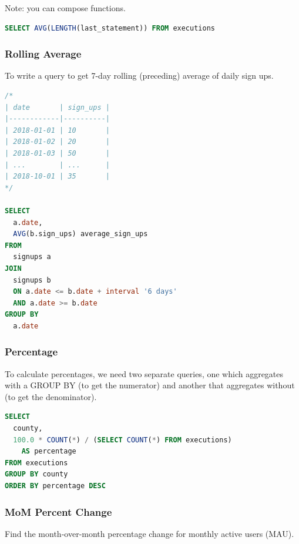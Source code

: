 \documentclass{article}
\begin{document}
Note: you can compose functions.

\vspace{8pt} \begin{lstlisting}[language=SQL]
SELECT AVG(LENGTH(last_statement)) FROM executions
\end{lstlisting} \vspace{8pt}


\subsubsection{Rolling Average}
To write a query to get 7-day rolling (preceding) average of daily sign ups.

\vspace{8pt} \begin{lstlisting}[language=SQL]
/*
| date       | sign_ups |
|------------|----------|
| 2018-01-01 | 10       |
| 2018-01-02 | 20       |
| 2018-01-03 | 50       |
| ...        | ...      |
| 2018-10-01 | 35       |
*/

SELECT 
  a.date, 
  AVG(b.sign_ups) average_sign_ups 
FROM 
  signups a 
JOIN 
  signups b 
  ON a.date <= b.date + interval '6 days' 
  AND a.date >= b.date
GROUP BY 
  a.date
\end{lstlisting} \vspace{8pt}

\subsubsection{Percentage}

To calculate percentages, we need two separate queries, one which aggregates with a GROUP BY (to get the numerator) and another that aggregates without (to get the denominator). 

\vspace{8pt} \begin{lstlisting}[language=SQL]
SELECT
  county,
  100.0 * COUNT(*) / (SELECT COUNT(*) FROM executions)
    AS percentage
FROM executions
GROUP BY county
ORDER BY percentage DESC
\end{lstlisting} \vspace{8pt}

\subsubsection{MoM Percent Change}
Find the month-over-month percentage change for monthly active users (MAU).
\end{document}
